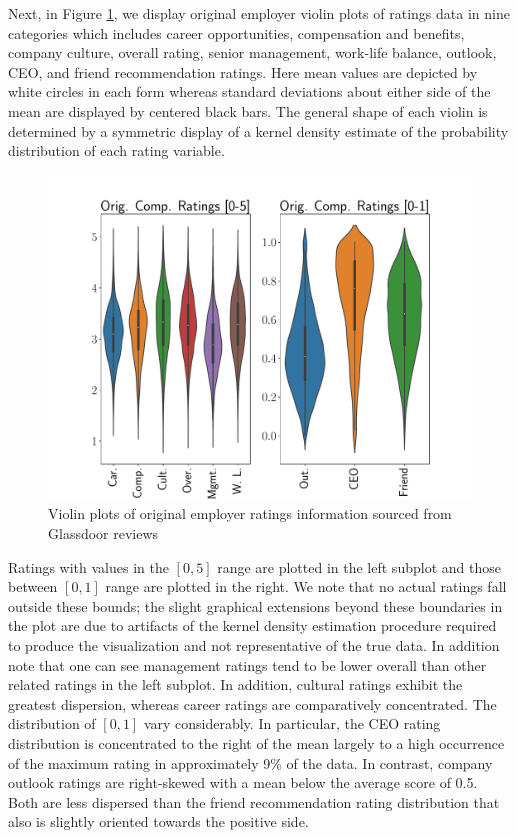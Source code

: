\documentclass[10pt]{article}
\begin{document}
Next, in Figure \ref{fig:vioplt}, we display original employer violin plots of ratings data in nine 
categories which includes career opportunities, compensation and benefits, company culture, 
overall rating, senior management, work-life balance, outlook, CEO, and friend recommendation 
ratings.  Here mean values are depicted by white circles in each form whereas standard deviations 
about either side of the mean are displayed by centered black bars.  The general shape of 
each violin is determined by a symmetric display of a kernel density estimate of the 
probability distribution of each rating variable.
%
\begin{figure}[thb]
    \centering
	\includegraphics[width=1.0\linewidth]{vioplt.pdf}
	\caption{Violin plots of original employer ratings information sourced from Glassdoor reviews }
	\label{fig:vioplt}
\end{figure}
%
Ratings with values in the $[0,5]$ range are plotted in the left subplot and those between 
$[0,1]$ range are plotted in the right.  We note that no actual ratings fall outside these 
bounds; the slight graphical extensions beyond these boundaries in the plot are due to 
artifacts of the kernel density estimation procedure required to 
produce the visualization and not representative of the true data. 
In addition note that one can see management ratings tend to be lower overall than 
other related ratings in the left subplot.  In addition, cultural ratings exhibit 
the greatest dispersion, whereas career ratings are comparatively concentrated.
The distribution of $[0,1]$ vary considerably.  In particular, the CEO rating distribution 
is concentrated to the right of the mean largely to a high occurrence of the maximum rating in 
approximately 9\% of the data.  In contrast, company outlook ratings are right-skewed with 
a mean below the average score of 0.5.  Both are less dispersed than the friend recommendation 
rating distribution that also is slightly oriented towards the positive side.
\end{document}

